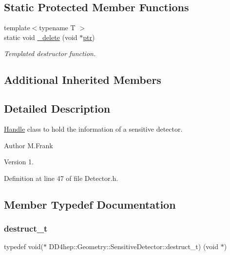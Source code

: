 \subsection*{Static Protected Member Functions}
\begin{DoxyCompactItemize}
\item 
{\footnotesize template$<$typename T $>$ }\\static void \hyperlink{class_d_d4hep_1_1_geometry_1_1_sensitive_detector_ab047704cfbeb2fc5ce87d752f44e187d}{\+\_\+delete} (void $\ast$\hyperlink{class_d_d4hep_1_1_handle_a6f165a9eec329d2d65172767b5f2777a}{ptr})
\begin{DoxyCompactList}\small\item\em Templated destructor function. \end{DoxyCompactList}\end{DoxyCompactItemize}
\subsection*{Additional Inherited Members}


\subsection{Detailed Description}
\hyperlink{class_d_d4hep_1_1_handle}{Handle} class to hold the information of a sensitive detector. 

\begin{DoxyAuthor}{Author}
M.\+Frank 
\end{DoxyAuthor}
\begin{DoxyVersion}{Version}
1. 
\end{DoxyVersion}


Definition at line 47 of file Detector.\+h.



\subsection{Member Typedef Documentation}
\hypertarget{class_d_d4hep_1_1_geometry_1_1_sensitive_detector_a783d0249ce87263b68232451b0159bec}{}\label{class_d_d4hep_1_1_geometry_1_1_sensitive_detector_a783d0249ce87263b68232451b0159bec} 
\subsubsection{\texorpdfstring{destruct\+\_\+t}{destruct\_t}}
{\footnotesize\ttfamily typedef void($\ast$ D\+D4hep\+::\+Geometry\+::\+Sensitive\+Detector\+::destruct\+\_\+t) (void $\ast$)}



